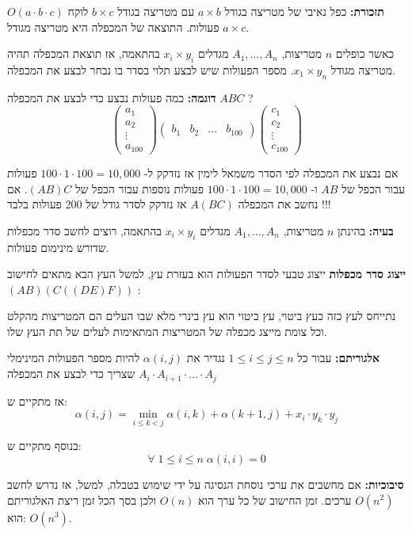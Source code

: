 \textbf{תזכורת:}
כפל נאיבי של מטריצה בגודל 
$a \times b$
עם מטריצה בגודל 
$b \times c$
לוקח 
$O(a \cdot b \cdot c)$
פעולות.
התוצאה של המכפלה היא מטריצה מגודל 
$a \times c$.

כאשר כופלים $n$ מטריצות, 
$A_1,\ldots,A_n$
מגדלים 
$x_i \times y_i$
בהתאמה, אז תוצאת המכפלה תהיה מטריצה מגודל
$x_1 \times y_n$.
מספר הפעולות שיש לבצע תלוי בסדר בו נבחר לבצע את המכפלה.

\textbf{דוגמה:}
כמה פעולות נבצע כדי לבצע את המכפלה
$ABC$
?
$$
\begin{pmatrix}
a_{1}
\\
a_{2}
\\
\vdots
\\
a_{100}
\end{pmatrix}
%
\begin{pmatrix}
b_{1}	&	b_{2} & \dots &  b_{100}
\end{pmatrix}
%
\begin{pmatrix}
c_{1}
\\
c_{2}
\\
\vdots
\\
c_{100}
\end{pmatrix}
$$

אם נבצע את המכפלה לפי הסדר משמאל לימין אז נזדקק ל-%
$100 \cdot 1 \cdot 100 = 10,000$
פעולות עבור הכפל של 
$AB$
ו-%
$100 \cdot 1 \cdot 100 = 10,000$
פעולות נוספות עבור הכפל של
$(AB)C$.
אם נחשב את המכפלה
$A(BC)$
אז נזדקק לסדר גודל של 200 פעולות בלבד !!!

\textbf{בעיה:}
בהינתן $n$ מטריצות, 
$A_1,\ldots,A_n$
מגדלים 
$x_i \times y_i$
בהתאמה, רוצים לחשב סדר מכפלות שדורש מינימום פעולות.

\textbf{ייצוג סדר מכפלות}
ייצוג טבעי לסדר הפעולות הוא בעזרת עץ, למשל העץ הבא מתאים לחישוב
$(AB)(C((DE)F))$
:
\begin{center}
\end{center}

נתייחס לעץ כזה כעץ ביטוי, עץ ביטוי הוא עץ בינרי מלא שבו העלים הם המטריצות מהקלט וכל צומת 
מייצג מכפלה של המטריצות המתאימות לעלים של תת העץ שלו.

\textbf{אלגוריתם:}
עבור כל 
$1 \leq i \leq j \leq n$
נגדיר את
$\alpha(i, j)$
להיות מספר הפעולות המינימלי שצריך כדי לבצע את המכפלה
$A_i \cdot A_{i + 1} \cdot \ldots \cdot A_j$

אז מתקיים ש:%
$$
\alpha(i, j) = \min_{i \leq k < j} 
\alpha(i, k) + \alpha(k + 1, j) + x_i \cdot y_k \cdot y_j
$$

בנוסף מתקיים ש:
$$
\forall \; 1 \leq i \leq n \; \alpha(i,i) = 0
$$

\textbf{סיבוכיות:}
אם מחשבים את ערכי נוסחת הנסיגה על ידי שימוש בטבלה, למשל, אז נדרש לחשב
$O(n^2)$
ערכים. 
זמן החישוב של כל ערך הוא 
$O(n)$
ולכן בסך הכל זמן ריצת האלגוריתם הוא:
$O(n^3)$.
